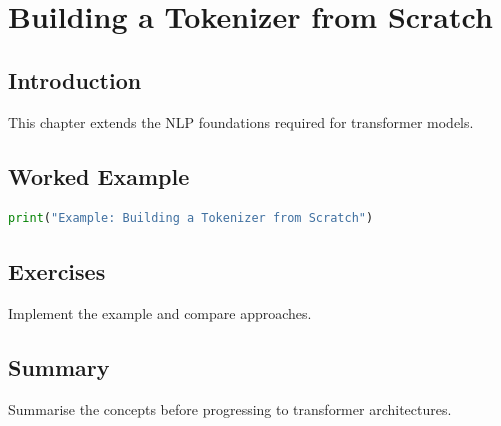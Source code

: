 \chapter{Building a Tokenizer from Scratch}
\label{chap:vol8-10}



\section{Introduction}
This chapter extends the NLP foundations required for transformer models.

\section{Worked Example}
\begin{lstlisting}[language=Python]
print("Example: Building a Tokenizer from Scratch")
\end{lstlisting}

\section{Exercises}
\begin{exercise}
Implement the example and compare approaches.
\end{exercise}

\section{Summary}
Summarise the concepts before progressing to transformer architectures.
